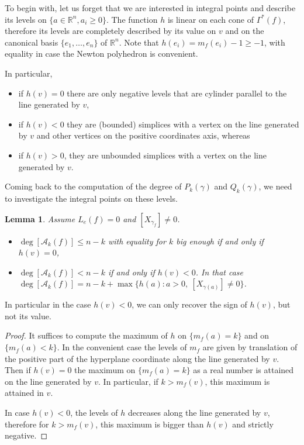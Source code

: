 \documentclass[12pt,a4paper,leqno]{amsart}
\newtheorem{lem}[thm]{Lemma}
\theoremstyle{definition}
\begin{document}
 
To begin with, let us forget that we are interested in integral points
and describe its
levels on $\{a\in \mathbb R^n, a_i \geq 0 \}$. The function $h$ is linear on each
cone of $\Gamma^*(f)$, therefore its levels are completely described
by its value on $v$ and on the canonical basis $\{e_1,\ldots,e_n\}$ of
$\mathbb R^n$. Note that $h(e_i)=m_f(e_i)-1\geq -1$, with equality in case the
Newton polyhedron is convenient.

In particular, 
\begin{itemize}
\item if $h(v)=0$ there are only negative levels
that are cylinder parallel to
the line generated by $v$, 
\item if $h(v)<0$ they are (bounded) simplices with a
vertex on the line generated by $v$ and other vertices on the
positive coordinates axis, whereas 
\item if $h(v)>0$, they are unbounded simplices with a
vertex on the line generated by $v$.
\end{itemize}
Coming back to the computation of the degree of  $P_k(\gamma)$ and $
Q_k(\gamma)$, we need to investigate the integral points on these
levels.

\begin{lem} Assume $L_e(f)=0$ and $[X_{\gamma_f}]\neq 0$. 
\begin{itemize}
\item $\deg [\mathcal A_k(f)]\leq n-k$ with equality 
for $k$ big enough if and only if $h(v)=0$,
\item $\deg [\mathcal A_k(f)]<n-k$ if and only if $h(v)<0$. In that
  case $\deg [\mathcal A_k(f)]=n-k+\textrm{{$\max$}}\{h(a):a>0,~[X_{\gamma
    (a)}]\neq 0 \}$.
\end{itemize}
\end{lem}

In particular in the case $h(v)<0$, we can only recover the sign of
$h(v)$, but not its value.

\begin{proof} It suffices to compute the maximum of $h$ on
  $\{m_f(a)=k\}$ and on $\{m_f(a)<k\}$. In the convenient case the
  levels of $m_f$ are given by translation of the positive part
  of the hyperplane
  coordinate along the line generated by $v$. Then if $h(v)=0$
  the maximum on $\{m_f(a)=k\}$ as a real number is attained on the
  line generated by $v$. In particular, if $k>m_f(v)$, this maximum is
  attained in $v$.

In case $h(v)<0$, the levels of $h$ decreases along the line generated
by $v$, therefore for $k>m_f(v)$, this maximum is bigger than $h(v)$
and strictly negative.
\end{proof}
\end{document}
